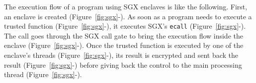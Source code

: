 The execution flow of a program using SGX enclaves is like the following.
First, an enclave is created (Figure~\ref{fig:sgx}-).
As soon as a program needs to execute a trusted function (Figure~\ref{fig:sgx}-), it executes SGX's \texttt{ecall} (Figure~\ref{fig:sgx}-).
The call goes through the SGX call gate to bring the execution flow inside the enclave (Figure~\ref{fig:sgx}-).
Once the trusted function is executed by one of the enclave's threads (Figure~\ref{fig:sgx}-), its result is encrypted and sent back the result (Figure~\ref{fig:sgx}-) before giving back the control to the main processing thread (Figure~\ref{fig:sgx}-).